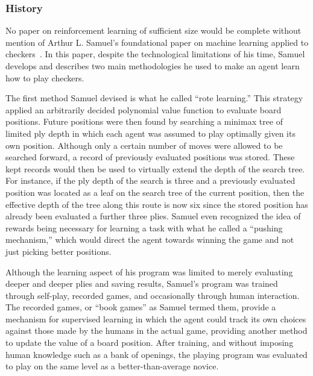 

\subsubsection*{History}


No paper on reinforcement learning of sufficient size would be complete without
mention of Arthur L. Samuel's foundational paper on machine learning applied to
checkers~\cite{samuel_checkers}.
%
In this paper,
despite the technological limitations of his time,
Samuel develops and describes two main methodologies he used to make an agent
learn how to play checkers.

The first method Samuel devised is what he called ``rote learning.''
%
This strategy applied an arbitrarily decided polynomial value function
to evaluate board positions.
%
Future positions were then found by searching a minimax tree
of limited ply depth
in which each agent was assumed to play optimally given its own position.
%
Although only a certain number of moves were allowed to be searched forward,
a record of previously evaluated positions was stored.
%
These kept records would then be used to virtually extend the depth of the
search tree.
%
For instance,
if the ply depth of the search is three and a previously evaluated position was
located as a leaf on the search tree of the current position,
then the effective depth of the tree along this route is now six since the
stored position has already been evaluated a further three plies.
%
Samuel even recognized the idea of rewards being necessary for learning a task
with what he called a ``pushing mechanism,'' which would direct the agent towards
winning the game and not just picking better positions.

Although the learning aspect of his program was limited to merely evaluating
deeper and deeper plies and saving results,
Samuel's program was trained through self-play, recorded games, and occasionally
through human interaction.
%
The recorded games, or ``book games'' as Samuel termed them,
provide a mechanism for supervised learning in which the agent could track its
own choices against those made by the humans in the actual game,
providing another method to update the value of a board position.
%
After training,
and without imposing human knowledge such as a bank of openings,
the playing program was evaluated to play on the same level as a
better-than-average novice.

